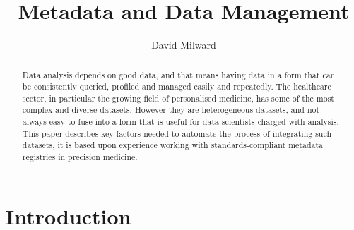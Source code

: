 \documentclass[runningheads]{llncs}
\begin{document}
	
\title{Metadata and Data Management }
		
\author{David Milward}
		\maketitle              %
	

	
	\begin{abstract}
		
		Data analysis depends on good data, and that means having data in a form that can be consistently queried, profiled and managed easily and repeatedly. The healthcare sector, in particular the growing field of personalised medicine, has some of the most complex and diverse datasets. However they are heterogeneous datasets, and not always easy to fuse into a form that is useful for data scientists charged with analysis. This paper describes key factors needed to automate the process of integrating such datasets, it is based upon experience working with standards-compliant metadata registries in precision medicine.
		
		
		
	

		
	\end{abstract}
	
	\section{Introduction}
	
\end{document}
